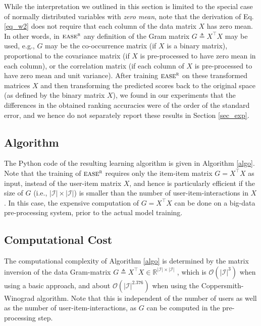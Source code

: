 \documentclass[sigconf]{acmart}
\newcommand{\sae}{${\textsc{ease}}^{\textsc{r}}$}
\newcommand{\X}{X}
\newcommand{\I}{\mathcal{ I}}
\begin{document}
While the interpretation we outlined in this section is limited to the special case of normally distributed 
variables with \emph{zero mean}, note that the derivation of Eq. \ref{eq_w2} does not require that each column of the data matrix $\X$ has zero mean. In other words, in \sae{}  any definition of  the Gram matrix $G \triangleq \X^\top \X$ may be used, e.g., $G$ may be the co-occurrence matrix (if $\X$ is a binary matrix), proportional to the covariance matrix (if $\X$ is pre-processed to have zero mean in each column), or the correlation matrix (if each column of $\X$ is pre-processed to have zero mean and unit variance). After training \sae{}  on  these transformed matrices $\X$ and then transforming the predicted scores back to the original space (as defined by the binary matrix $\X$), we found in our experiments that the differences in the obtained ranking accuracies were of the order of the standard error, and we hence do not separately report these results in Section \ref{sec_exp}. 


  

\subsection{Algorithm}
\label{sec_algo}
The Python code of the resulting learning algorithm is given  in Algorithm \ref{algo}. 
Note that the training of \sae{}  requires only the item-item matrix  $G=\X^\top \X$ as input, instead of the user-item matrix $\X$, and  hence is particularly efficient if the size of $G$ (i.e., $|\I|\times|\I|$) is smaller than the number of user-item-interactions in $\X$. In this case, the expensive computation of $G=\X^\top \X$ can be done on a big-data pre-processing system, prior to the actual model training. 



\subsection{Computational Cost}
\label{sec_complexity}
The computational complexity of Algorithm \ref{algo} is determined by the matrix inversion of the data Gram-matrix $G \triangleq \X^\top X \in  \mathbb{R}^{|\I|\times|\I|}$ , which is $\mathcal{O}(|\I|^{3})$ when using a basic approach, and about $\mathcal{O}(|\I|^{2.376})$ when using the Coppersmith-Winograd algorithm. Note that this is independent of the number of users as well as the number of user-item-interactions, as $G$ can be computed in the pre-processing step. 
\end{document}
